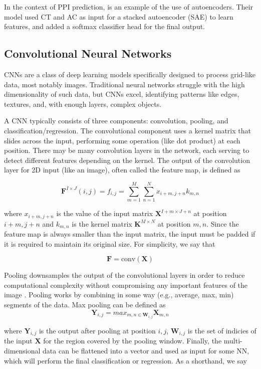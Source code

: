 \documentclass{article}
\begin{document}
In the context of PPI prediction, \citet{sun_sequence-based_2017} is an example of the use of autoencoders. Their model used CT and AC as input for a stacked autoencoder (SAE) to learn features, and added a softmax classifier head for the final output.



\subsection{Convolutional Neural Networks}
CNNs are a class of deep learning models specifically designed to process grid-like data, most notably images. Traditional neural networks struggle with the high dimensionality of such data, but CNNs excel, identifying patterns like edges, textures, and, with enough layers, complex objects. 

A CNN typically consists of three components: convolution, pooling, and classification/regression. The convolutional component uses a kernel matrix that slides across the input, performing some operation (like dot product) at each position. There may be many convolution layers in the network, each serving to detect different features depending on the kernel. The output of the convolution layer for 2D input (like an image), often called the feature map, is defined as 

\[\mathbf{F}^{I\times J}(i,j) = f_{i,j} = \displaystyle\sum_{m=1}^{M}\displaystyle\sum_{n=1}^{N} x_{i+m, j+n}k_{m,n}\]

where \(x_{i+m,j+n}\) is the value of the input matrix \(\mathbf{X}^{I+m\times J+n}\) at position \(i+m,j+n\) and \(k_{m,n}\) is the kernel matrix \(\mathbf{K}^{M\times N}\) at position \(m,n\). Since the feature map is always smaller than the input matrix, the input must be padded if it is required to maintain its original size. For simplicity, we say that

\[\mathbf{F} = \text{conv}(\mathbf{X})\]

Pooling downsamples the output of the convolutional layers in order to reduce computational complexity without compromising any important features of the image \citep{zafar_convolutional_2024}. Pooling works by combining in some way (e.g., average, max, min) segments of the data. Max pooling can be defined as
\[ \mathbf{Y}_{i,j} = max_{m,n \in \mathbf{W}_{i,j}} \mathbf{X}_{m,n} \]

where \(\mathbf{Y}_{i,j}\) is the output after pooling at position \(i,j\), \(\mathbf{W}_{i,j}\) is the set of indicies of the input \(\mathbf{X}\) for the region covered by the pooling window. Finally, the multi-dimensional data can be flattened into a vector and used as input for some NN, which will perform the final classification or regression. As a shorthand, we say 
\end{document}
